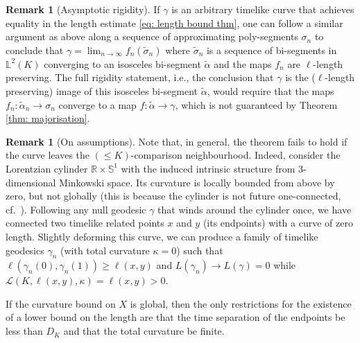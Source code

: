 \documentclass[hidelinks,12pt,a4paper]{article}
\numberwithin{equation}{section}
\theoremstyle{plain}
\theoremstyle{definition}
\newtheorem{remark}[definition]{Remark}
\newcommand{\R}{\mathbb R}
\newcommand{\lm}[1]{\mathbb{L}^2(#1)}
\begin{document}
\begin{remark}[Asymptotic rigidity]
If $\gamma$ is an arbitrary timelike curve that achieves equality in the length estimate \eqref{eq: length bound thm}, one can follow a similar argument as above along a sequence of approximating poly-segments $\sigma_n$ to conclude that $\gamma = \lim_{n \rightarrow \infty} f_n(\tilde \sigma_n)$ where $\tilde \sigma_n$ is a sequence of bi-segments in $\lm K$ converging to an isosceles bi-segment $\tilde\alpha$ and the maps $f_n$ are $\ell$-length preserving.
The full rigidity statement, i.e., the conclusion that $\gamma$ is the ($\ell$-length preserving) image of this isosceles bi-segment $\tilde \alpha$, would require that the maps $f_n \colon \tilde \alpha_n \rightarrow \sigma_n$ converge to a map $f \colon \tilde \alpha \rightarrow \gamma$, which is not guaranteed by Theorem \ref{thm: majorisation}. 
\end{remark}


\begin{remark}[On assumptions]
Note that, in general, the theorem fails to hold if the curve leaves the $(\leq K)$-comparison neighbourhood.
Indeed, consider the Lorentzian cylinder $\R \times \mathbb S^1$ with the induced intrinsic structure from 3-dimensional Minkowski space. 
Its curvature is locally bounded from above by zero, but not globally (this is because the cylinder is not future one-connected, cf.\ \cite{EGCartanHadamard}).
Following any null geodesic $\gamma$ that winds around the cylinder once, we have connected two timelike related points $x$ and $y$ (its endpoints) with a curve of zero length.
Slightly deforming this curve, we can produce a family of timelike geodesics $\gamma_n$ (with total curvature $\kappa = 0$) such that $\ell(\gamma_n(0),\gamma_n(1)) \geq \ell(x,y)$ and $L(\gamma_n) \rightarrow L(\gamma) =0$ while $\mathcal{L}(K,\ell(x,y),\kappa) = \ell(x,y) >0$. 
\end{remark}

If the curvature bound on $X$ is global, then the only restrictions for the existence of a lower bound on the length are that the time separation of the endpoints be less than $D_K$ and that the total curvature be finite.
\end{document}

